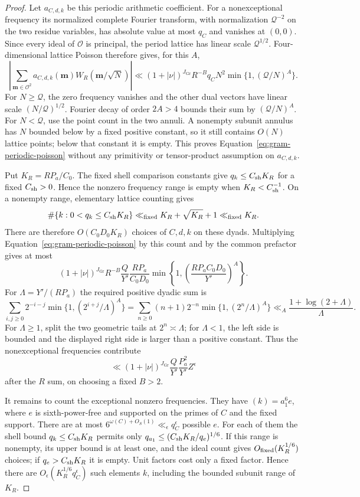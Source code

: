 \documentclass[11pt,a4paper]{article}
\numberwithin{equation}{section}
\numberwithin{figure}{section}
\theoremstyle{definition}
\theoremstyle{remark}
\begin{document}
\begin{proof}
Let $a_{C,d,k}$ be this periodic arithmetic coefficient.  For a
nonexceptional frequency its normalized complete Fourier transform,
with normalization $\mathcal Q^{-2}$ on the two residue variables,
has absolute value at most $q_C$ and vanishes at $(0,0)$.  Since
every ideal of $\mathcal O$ is principal, the period lattice has
linear scale $\mathcal Q^{1/2}$.  Four-dimensional lattice Poisson
therefore gives, for this $A$,
\begin{equation}
 \left|\sum_{\mathbf m\in\mathcal O^2}
       a_{C,d,k}(\mathbf m)W_R(\mathbf m/\sqrt N)\right|
 \ll (1+|\nu|)^{J_{\mathrm{Gr}}} R^{-B}q_C N^2
             \min\{1,(\mathcal Q/N)^A\}.
 \label{eq:gram-periodic-poisson}
\end{equation}
For $N\ge\mathcal Q$, the zero frequency vanishes and the other
dual vectors have linear scale $(N/\mathcal Q)^{1/2}$.  Fourier
decay of order $2A>4$ bounds their sum by $(\mathcal Q/N)^A$.
For $N<\mathcal Q$, use the point count in the two annuli.  A nonempty
subunit annulus has $N$ bounded below by a fixed positive constant,
so it still contains $O(N)$ lattice points; below that constant it
is empty.  This proves Equation~\eqref{eq:gram-periodic-poisson}
without any primitivity or tensor-product assumption on $a_{C,d,k}$.

Put $K_R=RP_a/C_0$.  The fixed shell comparison constants give
$q_k\le C_{\rm sh}K_R$ for a fixed $C_{\rm sh}>0$.  Hence the
nonzero frequency range is empty when $K_R<C_{\rm sh}^{-1}$.  On a
nonempty range, elementary lattice counting gives
\[
 \#\{k:0<q_k\le C_{\rm sh}K_R\}
       \ll_{\rm fixed}K_R+\sqrt{K_R}+1\ll_{\rm fixed}K_R.
\]
There are therefore $O(C_0D_0K_R)$ choices of $C,d,k$ on these
dyads.  Multiplying
Equation~\eqref{eq:gram-periodic-poisson} by this count and by the
common prefactor gives at most
\[
 (1+|\nu|)^{J_{\mathrm{Gr}}} R^{-B}\frac Q{Y'}\frac{RP_a}{C_0D_0}
       \min\left\{1,\left(\frac{RP_aC_0D_0}{Y'}\right)^A\right\}.
\]
For $\Lambda=Y'/(RP_a)$ the required positive dyadic sum is
\[
 \sum_{i,j\ge0}2^{-i-j}\min\{1,(2^{i+j}/\Lambda)^A\}
 =\sum_{n\ge0}(n+1)2^{-n}\min\{1,(2^n/\Lambda)^A\}
 \ll_A\frac{1+\log(2+\Lambda)}{\Lambda}.
\]
For $\Lambda\ge1$, split the two geometric tails at
$2^n\asymp\Lambda$; for $\Lambda<1$, the left side is bounded and
the displayed right side is larger than a positive constant.
Thus the nonexceptional frequencies contribute
\[
 \ll (1+|\nu|)^{J_{\mathrm{Gr}}}\frac Q{Y'}\frac{P_a^2}{Y'}Z^\epsilon
\]
after the $R$ sum, on choosing a fixed $B>2$.

It remains to count the exceptional nonzero frequencies.  They have
$(k)=a_1^6e$, where $e$ is sixth-power-free and supported on the
primes of $C$ and the fixed support.  There are at most
$6^{\omega(C)+O_S(1)}\ll_\epsilon q_C^\epsilon$ possible $e$.
For each of them the shell bound $q_k\le C_{\rm sh}K_R$ permits only
$q_{a_1}\le(C_{\rm sh}K_R/q_e)^{1/6}$.  If this range is nonempty,
its upper bound is at least one, and the ideal count gives
$O_{\rm fixed}(K_R^{1/6})$ choices; if $q_e>C_{\rm sh}K_R$ it is
empty.  Unit factors cost only a fixed factor.  Hence there are
$O_\epsilon(K_R^{1/6}q_C^\epsilon)$ such elements $k$, including
the bounded subunit range of $K_R$.


\end{proof}
\end{document}
